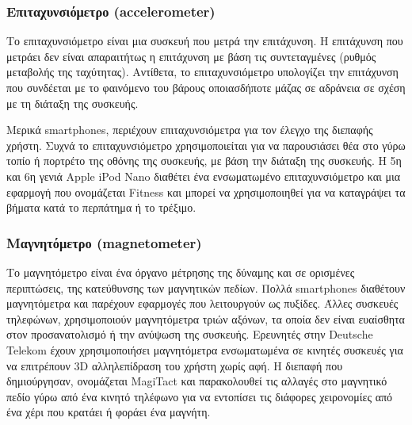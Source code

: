 \documentclass[12pt,twoside,openright]{report}
\begin{document}
\subsubsection*{\gt Επιταχυνσιόμετρο \lt (accelerometer)\gt}
Το επιταχυνσιόμετρο είναι μια συσκευή που μετρά την επιτάχυνση. Η επιτάχυνση που μετράει δεν είναι απαραιτήτως η επιτάχυνση με βάση τις συντεταγμένες (ρυθμός μεταβολής της ταχύτητας). Αντίθετα, το επιταχυνσιόμετρο υπολογίζει την επιτάχυνση που συνδέεται με το φαινόμενο του βάρους οποιασδήποτε μάζας σε αδράνεια σε σχέση με τη διάταξη της συσκευής.

Μερικά \lt smartphones, \gt περιέχουν επιταχυνσιόμετρα για τον έλεγχο της διεπαφής χρήστη. Συχνά το επιταχυνσιόμετρο χρησιμοποιείται για να παρουσιάσει θέα στο γύρω τοπίο ή πορτρέτο της οθόνης της συσκευής, με βάση την διάταξη της συσκευής. Η 5η και 6η γενιά \lt Apple iPod Nano \gt διαθέτει ένα ενσωματωμένο επιταχυνσιόμετρο και μια εφαρμογή  που ονομάζεται \lt Fitness \gt και μπορεί να χρησιμοποιηθεί για να καταγράψει τα βήματα κατά το περπάτημα ή το τρέξιμο.\cite{accelerometer}

\subsubsection*{\gt Μαγνητόμετρο \lt (magnetometer)\gt}

Το μαγνητόμετρο είναι ένα όργανο μέτρησης της δύναμης και σε ορισμένες περιπτώσεις, της κατεύθυνσης των μαγνητικών πεδίων. Πολλά \lt smartphones \gt διαθέτουν μαγνητόμετρα και παρέχουν εφαρμογές που λειτουργούν ως πυξίδες. Άλλες συσκευές τηλεφώνων, χρησιμοποιούν μαγνητόμετρα τριών αξόνων, τα οποία δεν είναι ευαίσθητα στον προσανατολισμό ή την ανύψωση της συσκευής. Ερευνητές στην \lt Deutsche Telekom \gt έχουν χρησιμοποιήσει μαγνητόμετρα ενσωματωμένα σε κινητές συσκευές για να επιτρέπουν \lt 3D \gt αλληλεπίδραση του χρήστη χωρίς αφή. Η διεπαφή που δημιούργησαν, ονομάζεται \lt MagiTact \gt και παρακολουθεί τις αλλαγές στο μαγνητικό πεδίο γύρω από ένα κινητό τηλέφωνο για να εντοπίσει τις διάφορες χειρονομίες από ένα χέρι που κρατάει ή φοράει ένα μαγνήτη.\cite{magnetometer}
\end{document}
